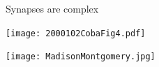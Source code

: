 \documentclass{beamer}%
\newcommand{\M}{\mathbf{M}}
\newcommand{\pot}{^{\text{pot}}}
\newcommand{\dep}{^{\text{dep}}}
\newcommand{\potdep}{^{\text{pot/dep}}}
\begin{document}
%
%
%


\begin{frame}{Synapses are complex}
%
 \parbox[t]{0.45\linewidth}{%
 \texttt{[image: 2000102CobaFig4.pdf]}

 }
 \hspace{0.05\linewidth}
 \parbox[t]{0.45\linewidth}{%
 \hfill
 \texttt{[image: MadisonMontgomery.jpg]}

 }
%
\end{frame}

\end{document}
